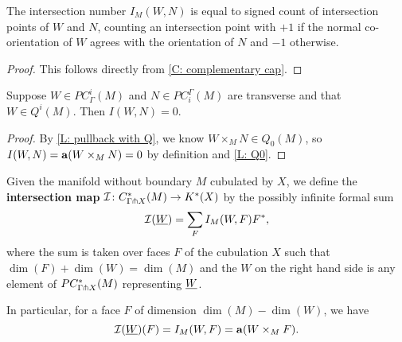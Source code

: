 \begin{lemma}\label{L: intersection number}
	The intersection number $I_M(W,N)$ is equal to signed count of intersection points of $W$ and $N$, counting an intersection point with $+1$ if the normal co-orientation of $W$ agrees with the orientation of $N$ and $-1$ otherwise.
\end{lemma}

\begin{proof}
	This follows directly from \cref{C: complementary cap}.
	\begin{comment}
		We first recall the construction of the pullback orientation $W \times_M N \to N$.
		As $W$ and $N$ are immersed near their geometric intersections, we can restrict to these immersed regions of $W$ and $N$ and so take the dimension of the Euclidean factor to be $0$ in Definition \ref{D: pullback coorient}.
		So then $\nu W$ is the oriented normal bundle of $W$ determined by the co-orientation in the immersed region, and we pull this back to be a normal bundle of $W \times_M N$ in $N$.
		In this simplified situation, Definition \ref{D: pullback coorient} tells us that the co-orientation of the pullback is the normal co-orientation corresponding to this pullback bundle, which is just the restriction of the normal bundle to the intersection point.
		So the co-orientation at each intersection point can be written as $(1,1 \wedge \beta_{\nu W}) = (1, \beta_{\nu W})$.
		So now by the discussion following Definition \ref{D: co-orientations}, we orient each point of the pullback by $1$ if $\beta_{\nu W}$ agrees with the orientation of $N$ and $-1$ otherwise.
		The lemma follows.
	\end{comment}
\end{proof}

\begin{lemma}\label{L: Q-trivial intersection}
	Suppose $W \in PC_\Gamma^i(M)$ and $N \in PC_{i}^\Gamma(M)$ are transverse and that $W \in Q^i(M)$.
	Then $I(W,N) = 0$.
\end{lemma}

\begin{proof}
	By \cref{L: pullback with Q}, we know $W \times_M N \in Q_0(M)$, so $I(W,N) = \mathbf{a}(W \times_M N) = 0$ by definition and \cref{L: Q0}.
\end{proof}

\begin{definition}\label{D: intersection homomorphism}
	Given the manifold without boundary $M$ cubulated by $X$, we define the \textbf{intersection map} $\mathcal{I} \colon C^*_{\Gamma \pitchfork X}(M) \to K^*(X)$ by the possibly infinite formal sum $$\mathcal{I}(\underline{W}) = \sum_F I_M(W,F)F^*,$$ where the sum is taken over faces $F$ of the cubulation $X$ such that $\dim(F)+\dim(W) = \dim(M)$ and the $W$ on the right hand side is any element of $PC^*_{\Gamma \pitchfork X}(M)$ representing $\underline{W}$.

	In particular, for a face $F$ of dimension $\dim(M)-\dim(W)$, we have $$\mathcal{I}(\underline{W})(F) = I_M(W,F) = \mathbf{a}(W \times_M F).$$
\end{definition}

